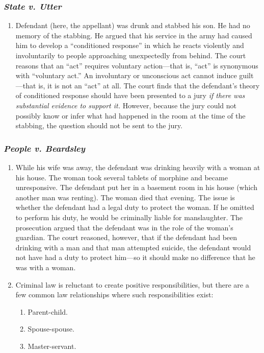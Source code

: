 \subsubsection{\emph{State v. Utter}}

\begin{enumerate}
    \item Defendant (here, the appellant) was drunk and stabbed his son. He had no memory of the stabbing. He argued that his service in the army had caused him to develop a ``conditioned response'' in which he reacts violently and involuntarily to people approaching unexpectedly from behind. The court reasons that an ``act'' requires voluntary action---that is, ``act'' is synonymous with ``voluntary act.'' An involuntary or unconscious act cannot induce guilt---that is, it is not an ``act'' at all. The court finds that the defendant's theory of conditioned response should have been presented to a jury \emph{if there was substantial evidence to support it.} However, because the jury could not possibly know or infer what had happened in the room at the time of the stabbing, the question should not be sent to the jury.
\end{enumerate}

\subsubsection{\emph{People v. Beardsley}}

\begin{enumerate}
    \item While his wife was away, the defendant was drinking heavily with a woman at his house. The woman took several tablets of morphine and became unresponsive. The defendant put her in a basement room in his house (which another man was renting). The woman died that evening. The issue is whether the defendant had a legal duty to protect the woman. If he omitted to perform his duty, he would be criminally liable for manslaughter. The prosecution argued that the defendant was in the role of the woman's guardian. The court reasoned, however, that if the defendant had been drinking with a man and that man attempted suicide, the defendant would not have had a duty to protect him---so it should make no difference that he was with a woman.
    \item Criminal law is reluctant to create positive responsibilities, but there are a few common law relationships where such responsibilities exist:
    \begin{enumerate}
        \item Parent-child.
        \item Spouse-spouse.
        \item Master-servant.
    \end{enumerate}
\end{enumerate}

